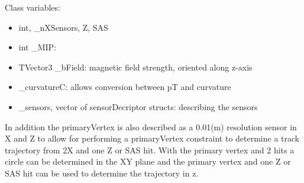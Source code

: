 \documentclass[aps,prd,superscriptaddress,floatfix]{revtex4}
\begin{document}
Class variables:
\begin{itemize}
\item int, \_nXSensors, Z, SAS 
\item int \_MIP: 
\item TVector3 \_bField: magnetic field strength, oriented along z-axis
\item \_curvatureC: allows conversion between pT and curvature
\item \_sensors, vector of sensorDecriptor structs: describing the sensors
\end{itemize}

In addition the primaryVertex is also described as a 0.01(m) resolution sensor in X and Z to allow
for performing a primaryVertex constraint to determine a track trajectory from 2X and one Z or SAS
hit.  With the primary vertex and 2 hits a circle can be determined in the XY plane and the primary
vertex and one Z or SAS hit can be used to determine the trajectory in z.








% 
\end{document}
